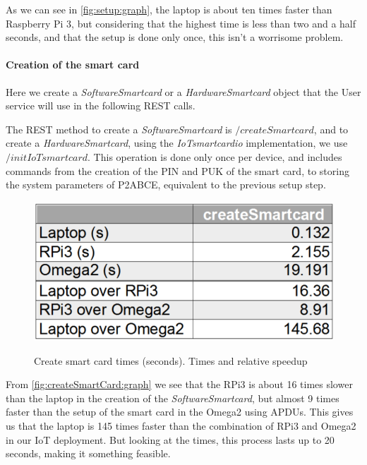 \documentclass[journal]{IEEEtran}
\begin{document}

As we can see in \autoref{fig:setup:graph}, the laptop is about ten times faster than Raspberry Pi 3, but considering that the highest time is less than two and a half seconds, and that the setup is done only once, this isn't a worrisome problem.

\paragraph{Creation of the smart card}\hfil

Here we create a \textit{SoftwareSmartcard} or a \textit{HardwareSmartcard} object that the User service will use in the following REST calls.

The REST method to create a \textit{SoftwareSmartcard} is $/createSmartcard$, and to create a \textit{HardwareSmartcard}, using the \textit{IoTsmartcardio} implementation, we use $/initIoTsmartcard$. This operation is done only once per device, and includes commands from the creation of the PIN and PUK of the smart card, to storing the system parameters of P2ABCE, equivalent to the previous setup step.


\begin{figure}[bth]
	\caption{Create smart card times (seconds). Times and relative speedup}
	\includegraphics[width=0.7\linewidth]{gfx/graphics/createSCtable}
	\label{fig:createSmartCard:graph}
\end{figure}



From \autoref{fig:createSmartCard:graph} we see that the RPi3 is about 16 times slower than the laptop in the creation of the \textit{SoftwareSmartcard}, but almost 9 times faster than the setup of the smart card in the Omega2 using APDUs. This gives us that the laptop is 145 times faster than the combination of RPi3 and Omega2 in our IoT deployment.
But looking at the times, this process lasts up to 20 seconds, making it something feasible.
\end{document}
